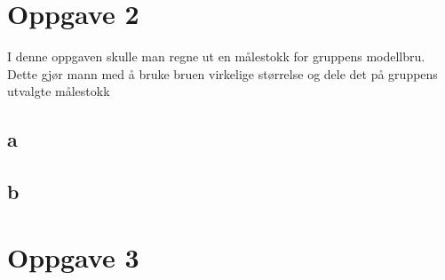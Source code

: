 \documentclass{report}
\begin{document}
\section{Oppgave 2}









I denne oppgaven skulle man regne ut en målestokk for gruppens modellbru. Dette gjør mann med å bruke bruen virkelige størrelse og dele det på gruppens utvalgte målestokk

\subsection{a}

\subsection{b}

\section{Oppgave 3}
\end{document}

